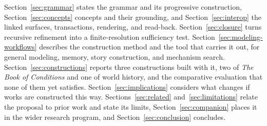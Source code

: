 \documentclass[11pt,a4paper]{article}
\begin{document}
Section~\ref{sec:grammar} states the grammar and its progressive construction,
Section~\ref{sec:concepts} concepts and their grounding, and
Section~\ref{sec:interop} the linked surfaces, transactions, rendering, and
read-back. Section~\ref{sec:closure} turns recursive refinement into a
finite-resolution sufficiency test. Section~\ref{sec:modeling-workflows}
describes the construction method and the tool that carries it out, for general
modeling, memory, story construction, and mechanism search.
Section~\ref{sec:constructions} reports three constructions built with it, two
of \emph{The Book of Conditions} and one of world history, and the comparative
evaluation that none of them yet satisfies. Section~\ref{sec:implications}
considers what changes if works are constructed this way.
Sections~\ref{sec:related} and~\ref{sec:limitations} relate the proposal to
prior work and state its limits, Section~\ref{sec:companion} places it in the
wider research program, and Section~\ref{sec:conclusion} concludes.
\end{document}
